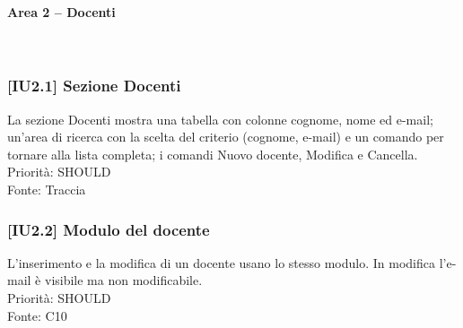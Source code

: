\paragraph{Area 2 – Docenti}~\\
\subsubsection{[IU2.1] Sezione Docenti}
La sezione Docenti mostra una tabella con colonne cognome, nome ed e-mail; un'area di ricerca con la scelta del criterio (cognome, e-mail) e un comando per tornare alla lista completa; i comandi Nuovo docente, Modifica e Cancella.\\
Priorità: SHOULD\\Fonte: Traccia

\subsubsection{[IU2.2] Modulo del docente}
L'inserimento e la modifica di un docente usano lo stesso modulo. In modifica l'e-mail è visibile ma non modificabile.\\
Priorità: SHOULD\\Fonte: C10
